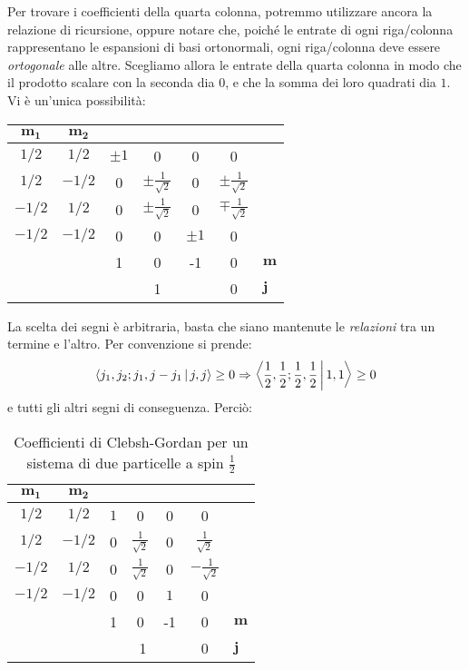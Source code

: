 \documentclass[../../FisicaTeorica.tex]{subfiles}
\begin{document}
Per trovare i coefficienti della quarta colonna, potremmo utilizzare ancora la relazione di ricursione, oppure notare che, poiché le entrate di ogni riga/colonna rappresentano le espansioni di basi ortonormali, ogni riga/colonna deve essere \textit{ortogonale} alle altre. Scegliamo allora le entrate della quarta colonna in modo che il prodotto scalare con la seconda dia $0$, e che la somma dei loro quadrati dia $1$. Vi è un'unica possibilità:
\begin{table}[H]
\centering
\begin{tabular}{@{}cccccc|l@{}}
\toprule
$\bm{m_1}$ & \multicolumn{1}{c|}{$\bm{m_2}$} &  &  &  &  &  \\ \midrule
$1/2$ & \multicolumn{1}{c|}{$1/2$} & $\pm 1$ & 0 & 0 & 0 &  \\
$1/2$ & \multicolumn{1}{c|}{$-1/2$} & 0  & $\pm\frac{1}{\sqrt{2}}$ & 0 & $\pm\frac{1}{\sqrt{2}}$  &  \\
$-1/2$ & \multicolumn{1}{c|}{$1/2$} & 0 & $\pm\frac{1}{\sqrt{2}}$ & 0 & $\mp\frac{1}{\sqrt{2}}$  &  \\
$-1/2$ & \multicolumn{1}{c|}{$-1/2$} & 0 & 0 & $\pm1$ & 0 &  \\ \midrule
 &  & 1 & 0 & -1 & 0 & $\bm{m}$ \\
 &  & \multicolumn{3}{c}{1} & 0 & $\bm{j}$ \\ \bottomrule
\end{tabular}
\label{tab:clebsh-Gordan-4}
\end{table}
La scelta dei segni è arbitraria, basta che siano mantenute le \textit{relazioni} tra un termine e l'altro. Per convenzione si prende:
\begin{align*}
\Braket{j_1, j_2; j_1, j-j_1|j,j} \geq 0 \Rightarrow \Braket{\frac{1}{2},\frac{1}{2};\frac{1}{2},\frac{1}{2}|1,1} \geq 0
\end{align*} 
e tutti gli altri segni di conseguenza. Perciò:
\begin{table}[H]
\centering
\begin{tabular}{@{}cccccc|l@{}}
\toprule
$\bm{m_1}$ & \multicolumn{1}{c|}{$\bm{m_2}$} &  &  &  &  &  \\ \midrule
$1/2$ & \multicolumn{1}{c|}{$1/2$} & $ 1$ & 0 & 0 & 0 &  \\
$1/2$ & \multicolumn{1}{c|}{$-1/2$} & 0  & $\frac{1}{\sqrt{2}}$ & 0 & $\frac{1}{\sqrt{2}}$  &  \\
$-1/2$ & \multicolumn{1}{c|}{$1/2$} & 0 & $\frac{1}{\sqrt{2}}$ & 0 & $-\frac{1}{\sqrt{2}}$  &  \\
$-1/2$ & \multicolumn{1}{c|}{$-1/2$} & 0 & 0 & $1$ & 0 &  \\ \midrule
 &  & 1 & 0 & -1 & 0 & $\bm{m}$ \\
 &  & \multicolumn{3}{c}{1} & 0 & $\bm{j}$ \\ \bottomrule
\end{tabular}
\caption{Coefficienti di Clebsh-Gordan per un sistema di due particelle a spin $\frac{1}{2}$}
\label{tab:clebsh-Gordan-5}
\end{table}
\end{document}
